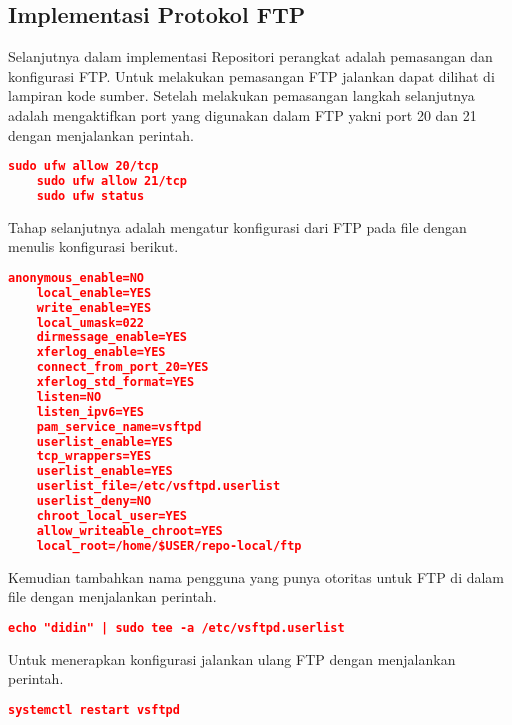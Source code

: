     \subsection{Implementasi Protokol FTP}
        Selanjutnya dalam implementasi Repositori perangkat adalah pemasangan dan konfigurasi FTP. Untuk melakukan pemasangan FTP jalankan dapat dilihat di lampiran kode sumber.
        Setelah melakukan pemasangan langkah selanjutnya adalah mengaktifkan port yang digunakan dalam FTP yakni port 20 dan 21 dengan menjalankan perintah.
    \begin{lstlisting}[frame=single,tabsize=2,breaklines,caption={Aktivasi port FTP},label=nonrootuser, captionpos=b, language=json,numbers=none]
    sudo ufw allow 20/tcp
    sudo ufw allow 21/tcp
    sudo ufw status
    \end{lstlisting}
        Tahap selanjutnya adalah mengatur konfigurasi dari FTP pada file  dengan menulis konfigurasi berikut.
    \begin{lstlisting}[frame=single,tabsize=2,breaklines,caption={Konfigurasi file FTP},label=nonrootuser, captionpos=b, language=json,numbers=none]
    anonymous_enable=NO
    local_enable=YES		
    write_enable=YES		
    local_umask=022		        
    dirmessage_enable=YES	        
    xferlog_enable=YES		
    connect_from_port_20=YES        
    xferlog_std_format=YES          
    listen=NO   			
    listen_ipv6=YES		        
    pam_service_name=vsftpd         
    userlist_enable=YES  	        
    tcp_wrappers=YES
    userlist_enable=YES                   
    userlist_file=/etc/vsftpd.userlist
    userlist_deny=NO
    chroot_local_user=YES
    allow_writeable_chroot=YES
    local_root=/home/$USER/repo-local/ftp
    \end{lstlisting}
        Kemudian tambahkan nama pengguna yang punya otoritas untuk FTP di dalam file  dengan menjalankan perintah.
    \begin{lstlisting}[frame=single,tabsize=2,breaklines,caption={Pengguna FTP},label=nonrootuser, captionpos=b, language=json,numbers=none]
    echo "didin" | sudo tee -a /etc/vsftpd.userlist
    \end{lstlisting}
        Untuk menerapkan konfigurasi jalankan ulang FTP dengan menjalankan perintah.
    \begin{lstlisting}[frame=single,tabsize=2,breaklines,caption={Jalan ulang FTP},label=nonrootuser, captionpos=b, language=json,numbers=none]
    systemctl restart vsftpd
    \end{lstlisting}
        
